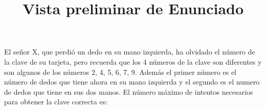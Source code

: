 \documentclass[a4paper,12pt]{article}\usepackage[spanish]{babel}\usepackage{times}
\title{Vista preliminar de Enunciado}
\begin{document}
\twocolumn 

\maketitle

El señor X, que perdió un dedo en su mano izquierda, ha olvidado el número de la clave de su tarjeta, pero recuerda que los 4 números  de la clave son diferentes y son algunos de los números 2, 4, 5, 6, 7, 9. Además el primer número es el número de dedos que tiene ahora en su mano izquierda y el segundo es el numero de dedos que tiene en sus dos manos.  El número máximo de intentos necesarios para obtener la clave correcta es: 
\end{document}

